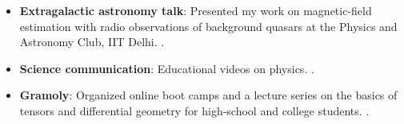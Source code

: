 \begin{itemize}[leftmargin=0.15in, label={}, itemsep=0pt]
  \item \textbf{Extragalactic astronomy talk}: Presented my work on magnetic-field estimation with radio observations of background quasars at the Physics and Astronomy Club, IIT Delhi. .
  \item \textbf{Science communication}: Educational videos on physics. .
  \item \textbf{Gramoly}: Organized online boot camps and a lecture series on the basics of tensors and differential geometry for high-school and college students. .
\end{itemize}

